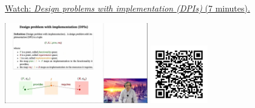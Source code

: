 
\begin{minipage}{10cm}
    \href{https://act4e-spring21.netlify.app/videos/spring2021-design:design:dpi-def.html}{Watch: \emph{Design problems with implementation (DPIs)} (7 minutes).}
        
    \href{https://act4e-spring21.netlify.app/videos/spring2021-design:design:dpi-def.html}{\includegraphics[height=3.5cm]{spring2021-design:design:dpi-def/thumbnails.jpg}}
    \href{https://act4e-spring21.netlify.app/videos/spring2021-design:design:dpi-def.html}{\includegraphics[height=2.5cm]{spring2021-design:design:dpi-def/qrcode.png}}
\end{minipage}
